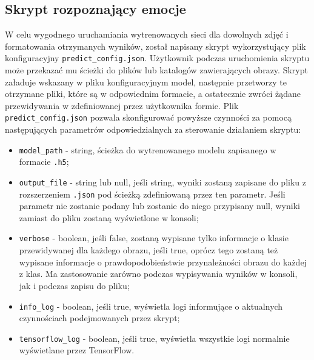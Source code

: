 \subsection{Skrypt rozpoznający emocje}
W celu wygodnego uruchamiania wytrenowanych sieci dla dowolnych zdjęć i formatowania otrzymanych wyników, został napisany skrypt wykorzystujący plik konfiguracyjny \verb|predict_config.json|.
Użytkownik podczas uruchomienia skryptu może przekazać mu ścieżki do plików lub katalogów zawierających obrazy. Skrypt załaduje wskazany w pliku konfiguracyjnym model, następnie przetworzy te otrzymane pliki, które są w odpowiednim formacie, a ostatecznie zwróci żądane przewidywania w zdefiniowanej przez użytkownika formie. Plik \verb|predict_config.json| pozwala skonfigurować powyższe czynności za pomocą następujących parametrów odpowiedzialnych za sterowanie działaniem skryptu:
\begin{itemize}
    \item \verb|model_path| - string, ścieżka do wytrenowanego modelu zapisanego w formacie \verb|.h5|;
    \item \verb|output_file| - string lub null, jeśli string, wyniki zostaną zapisane do pliku z rozszerzeniem \verb|.json| pod ścieżką zdefiniowaną przez ten parametr. Jeśli parametr nie zostanie podany lub zostanie do niego przypisany null, wyniki zamiast do pliku zostaną wyświetlone w konsoli;
    \item \verb|verbose| - boolean, jeśli false, zostaną wypisane tylko informacje o klasie przewidywanej dla każdego obrazu, jeśli true, oprócz tego zostaną też wypisane informacje o prawdopodobieństwie przynależności obrazu do każdej z klas. Ma zastosowanie zarówno podczas wypisywania wyników w konsoli, jak i podczas zapisu do pliku; 
    \item \verb|info_log| - boolean, jeśli true, wyświetla logi informujące o aktualnych czynnościach podejmowanych przez skrypt;
    \item \verb|tensorflow_log| - boolean, jeśli true, wyświetla wszystkie logi normalnie wyświetlane przez TensorFlow.
\end{itemize}


